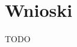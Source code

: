 \documentclass[a4paper,11pt,twoside]{mwrep}  %
\begin{document}
\endgroup

\begingroup
\let\clearpage\relax
\chapter{Wnioski}

TODO\\

\endgroup
\end{document}
